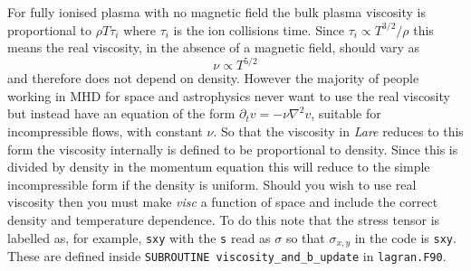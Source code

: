 \documentclass[11pt]{article}
\begin{document}
For fully ionised plasma with no magnetic field the bulk plasma viscosity is proportional to $\rho T \tau_i$ \cite{nrl} where $\tau_i$ is the ion collisions time. Since $\tau_i \propto T^{3/2}/\rho$ this means the real viscosity, in the absence of a magnetic field, should vary as 
\begin{displaymath}
  \nu \propto T^{5/2}
\end{displaymath} 
and therefore does not depend on density. However the majority of people working in MHD for space and astrophysics never want to use the real viscosity but instead have an equation of the form $\partial_t v = - \nu \nabla^2 v$, suitable for incompressible flows, with constant $\nu$. So that the viscosity in {\it Lare} reduces to this form the viscosity internally is defined to be proportional to density. Since this is divided by density in the momentum equation this will reduce to the simple incompressible form if the density is uniform. Should you wish to use real viscosity then you must make {\it visc} a function of space and include the correct density and temperature dependence. To do this note that the stress tensor is labelled as, for example, \texttt{sxy} with the \texttt{s} read as $\sigma$ so that $\sigma_{x,y}$ in the code is \texttt{sxy}. These are defined inside \texttt{SUBROUTINE viscosity\_and\_b\_update} in \texttt{lagran.F90}. 
 
\end{document}
